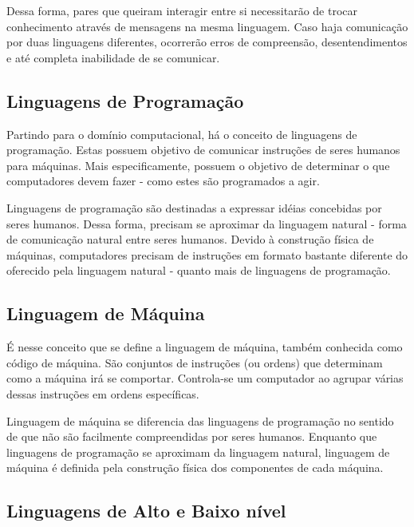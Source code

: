 Dessa forma, pares que queiram interagir entre si necessitarão de trocar
conhecimento através de mensagens na mesma linguagem. Caso haja comunicação por
duas linguagens diferentes, ocorrerão erros de compreensão, desentendimentos e
até completa inabilidade de se comunicar.

\subsection{Linguagens de Programação}

Partindo para o domínio computacional, há o conceito de linguagens de
programação. Estas possuem objetivo de comunicar instruções de seres humanos
para máquinas. Mais especificamente, possuem o objetivo de determinar o que
computadores devem fazer - como estes são programados a agir.

Linguagens de programação são destinadas a expressar idéias concebidas por seres
humanos. Dessa forma, precisam se aproximar da linguagem natural - forma de
comunicação natural entre seres humanos.  Devido à construção física de
máquinas, computadores precisam de instruções em formato bastante diferente do
oferecido pela linguagem natural - quanto mais de linguagens de programação.

\subsection{Linguagem de Máquina}

É nesse conceito que se define a linguagem de máquina, também conhecida como
código de máquina. São conjuntos de instruções (ou ordens) que determinam como a
máquina irá se comportar. Controla-se um computador ao agrupar várias dessas
instruções em ordens específicas.

Linguagem de máquina se diferencia das linguagens de programação no sentido de
que não são facilmente compreendidas por seres humanos. Enquanto que linguagens
de programação se aproximam da linguagem natural, linguagem de máquina é
definida pela construção física dos componentes de cada máquina.

\subsection{Linguagens de Alto e Baixo nível}


